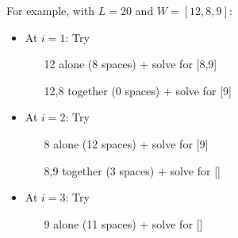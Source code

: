 \documentclass{article}
\begin{document}
    \begin{example}
      For example, with $L=20$ and $W=[12,8,9]$:
      \begin{itemize}
        \item At $i=1$: Try
          \begin{itemize}
            \item [12] alone (8 spaces) + solve for [8,9]
            \item [12,8] together (0 spaces) + solve for [9]
          \end{itemize}
        \item At $i=2$: Try
          \begin{itemize}
            \item [8] alone (12 spaces) + solve for [9]
            \item [8,9] together (3 spaces) + solve for []
          \end{itemize}
        \item At $i=3$: Try
          \begin{itemize}
            \item [9] alone (11 spaces) + solve for []
          \end{itemize}
      \end{itemize}
    \end{example}
\end{document}
